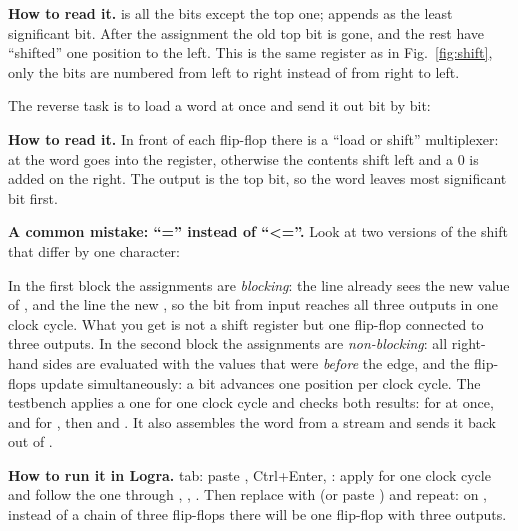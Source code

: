 \textbf{How to read it.}  is all the bits except the top one;
 appends  as the least significant bit. After the
assignment the old top bit is gone, and the rest have ``shifted'' one position
to the left. This is the same register as in Fig.~\ref{fig:shift}, only the bits
are numbered from left to right instead of from right to left.

The reverse task is to load a word at once and send it out bit by bit:


\textbf{How to read it.} In front of each flip-flop there is a ``load or shift''
multiplexer: at  the word  goes into the register, otherwise
the contents shift left and a 0 is added on the right. The output  is
the top bit, so the word leaves most significant bit first.

\textbf{A common mistake: ``='' instead of ``<=''.} Look at two versions of the
shift that differ by one character:



In the first block the assignments are \emph{blocking}: the line 
already sees the new value of , and the line  the new
, so the bit from input  reaches all three outputs in one clock
cycle. What you get is not a shift register but one flip-flop connected to three
outputs. In the second block the assignments are \emph{non-blocking}: all
right-hand sides are evaluated with the values that were \emph{before} the edge,
and the flip-flops update simultaneously: a bit advances one position per clock
cycle. The testbench  applies a one for one clock cycle and
checks both results:  for  at once, and for
 , then  and . It also assembles the
word  from a stream and sends it back out of .

\textbf{How to run it in Logra.}  tab: paste ,
Ctrl+Enter, : apply  for one clock cycle and follow the
one through , , . Then replace \code{<=} with \code{=}
(or paste ) and repeat: on , instead of a chain of
three flip-flops there will be one flip-flop with three outputs.

